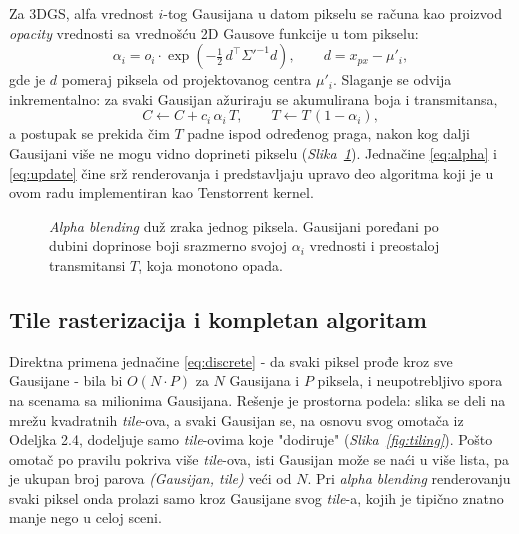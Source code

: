 \documentclass[12pt]{article}
\begin{document}
   Za 3DGS, alfa vrednost $i$-tog Gausijana u datom pikselu se računa kao proizvod
   \textit{opacity} vrednosti sa vrednošću 2D Gausove funkcije u tom pikselu:
   \begin{equation}\label{eq:alpha}
      \alpha_i = o_i \cdot \exp\!\left(-\tfrac{1}{2}\,d^\top \Sigma'^{-1} d\right),
      \qquad d = x_{px} - \mu'_i,
   \end{equation}
   gde je $d$ pomeraj piksela od projektovanog centra $\mu'_i$. Slaganje se odvija
   inkrementalno: za svaki Gausijan ažuriraju se akumulirana boja i transmitansa,
   \begin{equation}\label{eq:update}
      C \leftarrow C + c_i\,\alpha_i\,T, \qquad T \leftarrow T\,(1 - \alpha_i),
   \end{equation}
   a postupak se prekida čim $T$ padne ispod određenog praga, nakon kog dalji Gausijani više
   ne mogu vidno doprineti pikselu (\textit{Slika~\ref{fig:blend}}). Jednačine
   \eqref{eq:alpha} i \eqref{eq:update} čine srž renderovanja i predstavljaju
   upravo deo algoritma koji je u ovom radu implementiran kao Tenstorrent kernel.

   \begin{figure}[H]
      \centering
      \caption{\textit{Alpha blending} duž zraka jednog piksela. Gausijani poređani po dubini
      doprinose boji srazmerno svojoj $\alpha_i$ vrednosti i preostaloj transmitansi $T$,
      koja monotono opada.}
      \label{fig:blend}
   \end{figure}

   \subsection{Tile rasterizacija i kompletan algoritam}

   Direktna primena jednačine \eqref{eq:discrete} - da svaki piksel prođe kroz sve
   Gausijane - bila bi $O(N \cdot P)$ za $N$ Gausijana i $P$ piksela, i neupotrebljivo
   spora na scenama sa milionima Gausijana. Rešenje je prostorna podela: slika se
   deli na mrežu kvadratnih \textit{tile}-ova, a svaki Gausijan se, na osnovu svog
   omotača iz Odeljka 2.4, dodeljuje samo \textit{tile}-ovima koje "dodiruje"
   (\textit{Slika~\ref{fig:tiling}}). Pošto omotač po pravilu pokriva više
   \textit{tile}-ova, isti Gausijan može se naći u više lista, pa je ukupan broj
   parova \textit{(Gausijan, tile)} veći od $N$. Pri \textit{alpha blending} renderovanju svaki
   piksel onda prolazi samo kroz Gausijane svog \textit{tile}-a, kojih je tipično znatno
   manje nego u celoj sceni.
\end{document}
